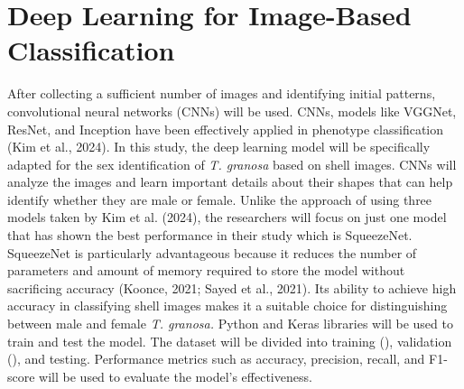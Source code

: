 \section{ Deep Learning for Image-Based Classification}
After collecting a sufficient number of images and identifying initial patterns, convolutional neural networks (CNNs) will be used. CNNs, models like VGGNet, ResNet, and Inception have been effectively applied in phenotype classification (Kim et al., 2024). In this study, the deep learning model will be specifically adapted for the sex identification of \textit{T. granosa} based on shell images. CNNs will analyze the images and learn important details about their shapes that can help identify whether they are male or female. 
Unlike the approach of using three models taken by Kim et al. (2024), the researchers will focus on just one model that has shown the best performance in their study which is SqueezeNet. SqueezeNet is particularly advantageous because it reduces the number of parameters and amount of memory required to store the model without sacrificing accuracy (Koonce, 2021; Sayed et al., 2021). Its ability to achieve high accuracy in classifying shell images makes it a suitable choice for distinguishing between male and female \textit{T. granosa.}
Python and Keras libraries will be used to train and test the model. The dataset will be divided into training (), validation (), and testing. Performance metrics such as accuracy, precision, recall, and F1-score will be used to evaluate the model's effectiveness.
